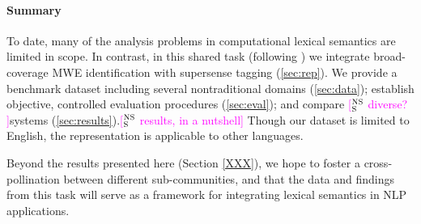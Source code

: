 \documentclass[11pt,letterpaper]{article}
\newcommand{\ensuretext}[1]{#1}
\newcommand{\nssmarker}{\ensuretext{\textcolor{magenta}{\ensuremath{^{\textsc{NS}}_{\textsc{S}}}}}}
\newcommand{\arkcomment}[3]{\ensuretext{\textcolor{#3}{[#1 #2]}}}
\newcommand{\nss}[1]{\arkcomment{\nssmarker}{#1}{magenta}}
\begin{document}
\paragraph{Summary}
To date, many of the analysis problems in computational lexical semantics are limited in scope.
In contrast, in this shared task (following \citet{schneider-15}) we integrate broad-coverage MWE identification with supersense tagging (\cref{sec:rep}).
We provide a benchmark dataset including several nontraditional domains (\cref{sec:data});
establish objective, controlled evaluation procedures (\cref{sec:eval});
and compare \nss{diverse? }systems (\cref{sec:results}).\nss{results, in a nutshell}
Though our dataset is limited to English, the representation is applicable to other languages.





Beyond the results presented here (Section \ref{XXX}), we hope 
to foster a cross-pollination between different sub-communities, 
and that the data and findings from this task will serve as a framework for integrating lexical semantics in NLP applications. 
\end{document}
